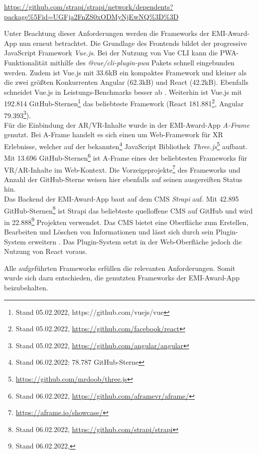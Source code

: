 \urldef\strapidep\url{https://github.com/strapi/strapi/network/dependents?package%5Fid=UGFja2FnZS0xODMyNjEwNQ%3D%3D}

Unter Beachtung dieser Anforderungen werden die Frameworks der EMI-Award-App nun
erneut betrachtet. Die Grundlage des Frontends bildet der progressive JavaScript
Framework \textit{Vue.js}. Bei der Nutzung von Vue CLI kann die
PWA-Funktionalität mithilfe des \textit{@vue/cli-plugin-pwa} Pakets schnell
eingebunden werden. Zudem ist Vue.js mit 33.6kB \cite[{v3.2.29, minifiziert und
            komprimiert}]{Kanodia2022} ein kompaktes Framework und kleiner als die zwei
größten Konkurrenten Angular (62.3kB) und React (42.2kB). Ebenfalls schneidet
Vue.js in Leistungs-Benchmarks besser ab \cite{Krause2022}. Weiterhin ist Vue.js
mit 192.814 GitHub-Sternen\footnote{Stand 05.02.2022,
    https://github.com/vuejs/vue} das beliebteste Framework (React
181.881\footnote{Stand 05.02.2022, \url{https://github.com/facebook/react}},
Angular 79.393\footnote{Stand 05.02.2022,
    \url{https://github.com/angular/angular}}). \\
Für die Einbindung der \ac{AR}/\ac{VR}-Inhalte wurde in der EMI-Award-App
\textit{A-Frame} genutzt. Bei A-Frame handelt es sich einen um Web-Framework für
\ac{XR} Erlebnisse, welcher auf der bekannten\footnote{Stand 06.02.2022: 78.787
GitHub-Sterne} JavaScript Bibliothek
\textit{Three.js}\footnote{\url{https://github.com/mrdoob/three.js}} aufbaut.
Mit 13.696 GitHub-Sternen\footnote{Stand 06.02.2022,
\url{https://github.com/aframevr/aframe/}} ist A-Frame eines der beliebtesten
Frameworks für \ac{VR}/\ac{AR}-Inhalte im Web-Kontext. Die
Vorzeigeprojekte\footnote{\url{https://aframe.io/showcase/}} des Frameworks und
Anzahl der GitHub-Sterne weisen hier ebenfalls auf seinen ausgereiften Status
hin. \\
Das Backend der EMI-Award-App baut auf dem \ac{CMS} \textit{Strapi} auf. Mit
42.895 GitHub-Sternen\footnote{Stand 06.02.2022,
\url{https://github.com/strapi/strapi}} ist Strapi das beliebteste quelloffene
\ac{CMS} auf GitHub und wird in 22.888\footnote{Stand 06.02.2022, \strapidep}
Projekten verwendet. Das \ac{CMS} bietet eine Oberfläche zum Erstellen,
Bearbeiten und Löschen von Informationen und lässt sich durch sein Plugin-System
erweitern \cite{Strapi2021}. Das Plugin-System setzt in der Web-Oberfläche
jedoch die Nutzung von React voraus.

Alle aufgeführten Frameworks erfüllen die relevanten Anforderungen. Somit wurde
sich dazu entschieden, die genutzten Frameworks der EMI-Award-App beizubehalten.

